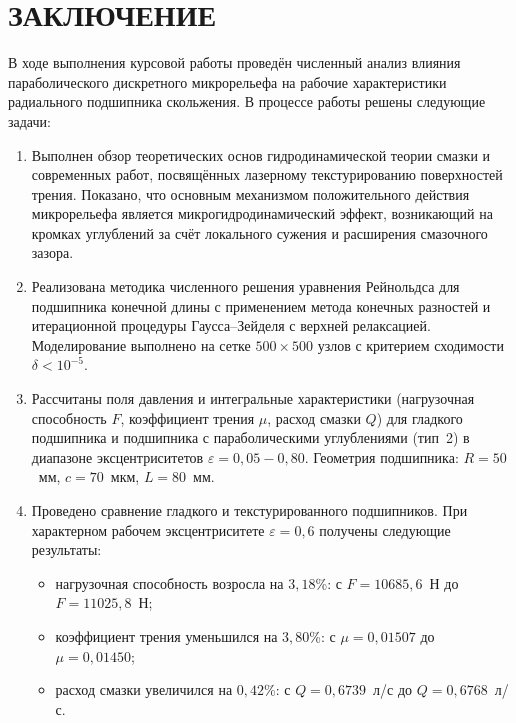 \section*{ЗАКЛЮЧЕНИЕ}
{}

В ходе выполнения курсовой работы проведён численный анализ влияния параболического дискретного микрорельефа на рабочие характеристики радиального подшипника скольжения. В процессе работы решены следующие задачи:

\begin{enumerate}
    \item Выполнен обзор теоретических основ гидродинамической теории смазки и современных работ, посвящённых лазерному текстурированию поверхностей трения. Показано, что основным механизмом положительного действия микрорельефа является микрогидродинамический эффект, возникающий на кромках углублений за счёт локального сужения и расширения смазочного зазора.

    \item Реализована методика численного решения уравнения Рейнольдса для подшипника конечной длины с применением метода конечных разностей и итерационной процедуры Гаусса--Зейделя с верхней релаксацией. Моделирование выполнено на сетке $500 \times 500$ узлов с критерием сходимости $\delta < 10^{-5}$.

    \item Рассчитаны поля давления и интегральные характеристики (нагрузочная способность $F$, коэффициент трения $\mu$, расход смазки $Q$) для гладкого подшипника и подшипника с параболическими углублениями (тип~2) в диапазоне эксцентриситетов $\varepsilon = 0{,}05 - 0{,}80$. Геометрия подшипника: $R = 50$~мм, $c = 70$~мкм, $L = 80$~мм.

    \item Проведено сравнение гладкого и текстурированного подшипников. При характерном рабочем эксцентриситете $\varepsilon = 0{,}6$ получены следующие результаты:
    \begin{itemize}
        \item нагрузочная способность возросла на $3{,}18$\%: с $F = 10685{,}6$~Н до $F = 11025{,}8$~Н;
        \item коэффициент трения уменьшился на $3{,}80$\%: с $\mu = 0{,}01507$ до $\mu = 0{,}01450$;
        \item расход смазки увеличился на $0{,}42$\%: с $Q = 0{,}6739$~л/с до $Q = 0{,}6768$~л/с.
    \end{itemize}
\end{enumerate}


